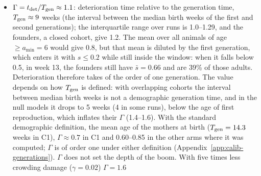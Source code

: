 \begin{itemize}
    window, so $t_{\rm det}$ measures deterioration and not the dilution by pups born with $s\le0.2$. In \textsf{C1}
    $D_{\rm eff}\approx0.13$ cells$^2$ per week (8 exploratory runs), $t_{\rm mix}\approx1.7\times10^3$ weeks and
    $t_{\rm det}\approx10$ weeks ($t_{\rm on}=6$, $t_{1/2}=16$; reference ensemble), so
    $\mathrm{Da}\approx1.7\times10^2$. Deterioration is correlated over
    $\xi=(4D_{\rm eff}t_{\rm det})^{1/2}\approx2$ cells, the size of the contact neighbourhood. In founder colonies the
    relevant transport is the colonisation front: the filling time $t_{\rm fill}\approx t_{\rm pk}\approx170$--215
    weeks against $t_{\rm det}\approx20$--30 gives $\mathrm{Da}_{\rm fill}\approx10$
    (Appendix~\ref{sec:calib-founders}). In Universe~25 mice crossed the enclosure daily and the social organisation
    took a whole phase~C, about 35 weeks, to die, so $\mathrm{Da}\lesssim4\times10^{-3}$. The spatial structure of the
    model therefore emerges among animals that are almost sessile on the time scale of deterioration, which is not
    Calhoun's regime. Colonies grow from local nuclei, so $\rho_{\rm pk}$ falls with $n_0$, from 0.40 at $N_0=400$ to
    0.03 for eight founders.
  \item $\Gamma=t_{\rm det}/T_{\rm gen}\approx1.1$: deterioration time relative to the generation time,
    $T_{\rm gen}\approx9$ weeks (the interval between the median birth weeks of the first and second generations);
    the interquartile range over runs is 1.0--1.29, and the founders, a closed cohort, give 1.2. The mean over all
    animals of age $\ge a_{\min}=6$ would give 0.8, but that mean is diluted by the first generation, which
    enters it with $s\le0.2$ while still inside the window: when it falls below 0.5, in week 13, the founders still
    have $\bar s=0.66$ and are 39\% of those adults. Deterioration therefore takes of the order of one generation.
    The value depends on how $T_{\rm gen}$ is defined: with overlapping cohorts the interval between median birth
    weeks is not a demographic generation time, and in the null models it drops to 5 weeks (4 in some runs), below
    the age of first reproduction, which inflates their $\Gamma$ (1.4--1.6). With the standard demographic
    definition, the mean age of the mothers at birth ($T_{\rm gen}=14.3$ weeks in \textsf{C1}), $\Gamma\approx0.7$
    in \textsf{C1} and 0.60--0.85 in the other arms where it was computed; $\Gamma$ is of order one under either
    definition (Appendix~\ref{app:calib-generations}).
    $\Gamma$ does not set the depth of the boom. With five times less crowding damage ($\gamma=0.02$) $\Gamma=1.6$

\end{itemize}
